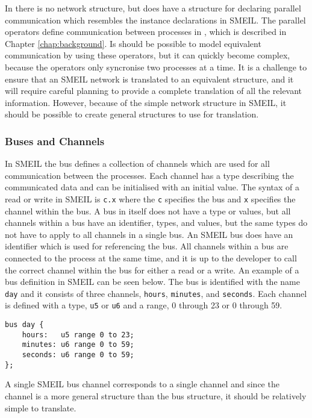 In \cspm{} there is no network structure, but \cspm{} does have a structure for declaring parallel communication which resembles the instance declarations in SMEIL. The parallel operators define communication between processes in \cspm{}, which is described in Chapter \ref{chap:background}. Is should be possible to model equivalent communication by using these operators, but it can quickly become complex, because the operators only syncronise two processes at a time. It is a challenge to ensure that an SMEIL network is translated to an equivalent \cspm{} structure, and it will require careful planning to provide a complete translation of all the relevant information. However, because of the simple network structure in SMEIL, it should be possible to create general \cspm{} structures to use for translation.
\subsubsection{Buses and Channels}
\label{bus_and_channels}
In SMEIL the bus defines a collection of channels which are used for all communication between the processes. Each channel has a type describing the communicated data and can be initialised with an initial value. The syntax of a read or write in SMEIL is \texttt{c.x} where the \texttt{c} specifies the bus and \texttt{x} specifies the channel within the bus. A bus in itself does not have a type or values, but all channels within a bus have an identifier, types, and values, but the same types do not have to apply to all channels in a single bus. An SMEIL bus does have an identifier which is used for referencing the bus. All channels within a bus are connected to the process at the same time, and it is up to the developer to call the correct channel within the bus for either a read or a write.
An example of a bus definition in SMEIL can be seen below. The bus is identified with the name \texttt{day} and it consists of three channels, \texttt{hours}, \texttt{minutes}, and \texttt{seconds}. Each channel is defined with a type, \texttt{u5} or \texttt{u6} and a range, 0 through 23 or 0 through 59.
\begin{verbatim}
bus day {
    hours:   u5 range 0 to 23;
    minutes: u6 range 0 to 59;
    seconds: u6 range 0 to 59;
};
\end{verbatim}
A single SMEIL bus channel corresponds to a single \cspm{} channel and since the channel is a more general structure than the bus structure, it should be relatively simple to translate.
